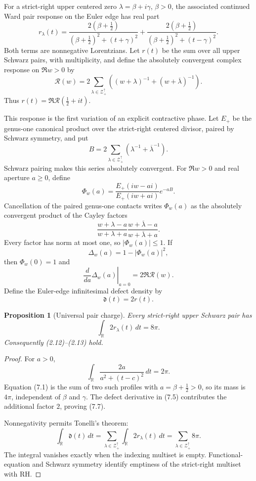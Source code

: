 \documentclass[11pt]{article}
\newtheorem{proposition}[theorem]{Proposition}
\theoremstyle{definition}
\theoremstyle{remark}
\newcommand{\R}{\mathbb R}
\newcommand{\cZ}{\mathcal Z}
\begin{document}
For a strict-right upper centered zero \(\lambda=\beta+i\gamma\), \(\beta>0\), the associated
continued Ward pair response on the Euler edge has real part
\[
 r_\lambda(t)=
 \frac{2(\beta+\frac12)}
 {(\beta+\frac12)^2+(t+\gamma)^2}
 +
 \frac{2(\beta+\frac12)}
 {(\beta+\frac12)^2+(t-\gamma)^2}.                  \tag{7.1}
\]
Both terms are nonnegative Lorentzians.  Let \(r(t)\) be the sum over all upper Schwarz pairs,
with multiplicity, and define the absolutely convergent complex response on \(\Re w>0\) by
\[
 \mathcal R(w)=2\sum_{\lambda\in\cZ_+^\uparrow}
 \left((w+\lambda)^{-1}+(w+\overline\lambda)^{-1}\right). \tag{7.2}
\]
Thus \(r(t)=\Re\mathcal R(\frac12+it)\).

This response is the first variation of an explicit contractive phase.  Let \(E_+\) be the
genus-one canonical product over the strict-right centered divisor, paired by Schwarz symmetry,
and put
\[
 B=2\sum_{\lambda\in\cZ_+^\uparrow}
 \left(\lambda^{-1}+\overline\lambda^{-1}\right).   \tag{7.3}
\]
Schwarz pairing makes this series absolutely convergent.  For \(\Re w>0\) and real aperture
\(a\ge0\), define
\[
 \Phi_w(a)=
 \frac{E_+(iw-ai)}{E_+(iw+ai)}e^{-aB}.              \tag{7.4}
\]
Cancellation of the paired genus-one contacts writes \(\Phi_w(a)\) as the absolutely
convergent product of the Cayley factors
\[
 \frac{w+\lambda-a}{w+\lambda+a}
 \frac{w+\overline\lambda-a}{w+\overline\lambda+a}.
\]
Every factor has norm at most one, so \(|\Phi_w(a)|\le1\).  If
\[
 \Delta_w(a)=1-|\Phi_w(a)|^2,
\]
then \(\Phi_w(0)=1\) and
\[
 \left.\frac{d}{da}\Delta_w(a)\right|_{a=0}
 =2\Re\mathcal R(w).                                 \tag{7.5}
\]
Define the Euler-edge infinitesimal defect density by
\[
 \mathfrak d(t)=2r(t).                              \tag{7.6}
\]

\begin{proposition}[Universal pair charge]\label{prop:charge}
Every strict-right upper Schwarz pair has
\[
 \int_{\R}2r_\lambda(t)\,dt=8\pi.                   \tag{7.7}
\]
Consequently (2.12)--(2.13) hold.
\end{proposition}

\begin{proof}
For \(a>0\),
\[
 \int_{\R}\frac{2a}{a^2+(t-c)^2}\,dt=2\pi.          \tag{7.8}
\]
Equation (7.1) is the sum of two such profiles with
\(a=\beta+\frac12>0\), so its mass is \(4\pi\), independent of \(\beta\) and \(\gamma\).
The defect derivative in (7.5) contributes the additional factor \(2\), proving (7.7).

Nonnegativity permits Tonelli's theorem:
\[
 \int_{\R}\mathfrak d(t)\,dt
 =\sum_{\lambda\in\cZ_+^\uparrow}
 \int_{\R}2r_\lambda(t)\,dt
 =\sum_{\lambda\in\cZ_+^\uparrow}8\pi.
\]
The integral vanishes exactly when the indexing multiset is empty.  Functional-equation and
Schwarz symmetry identify emptiness of the strict-right multiset with RH.
\end{proof}
\end{document}
